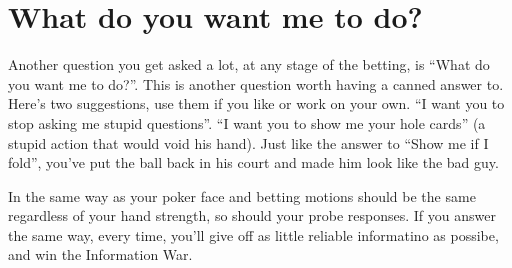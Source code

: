 \section{What do you want me to do?}

Another question you get asked a lot, at any stage of the betting, is
``What do you want me to do?''. This is another question worth having
a canned answer to. Here's two suggestions, use them if you like or
work on your own. ``I want you to stop asking me stupid
questions''. ``I want you to show me your hole cards'' (a stupid
action that would void his hand). Just like the answer to ``Show me if
I fold'', you've put the ball back in his court and made him look like
the bad guy.

In the same way as your poker face and betting motions should be the
same regardless of your hand strength, so should your probe
responses. If you answer the same way, every time, you'll give off
as little reliable informatino as possibe, and win the
Information War.
